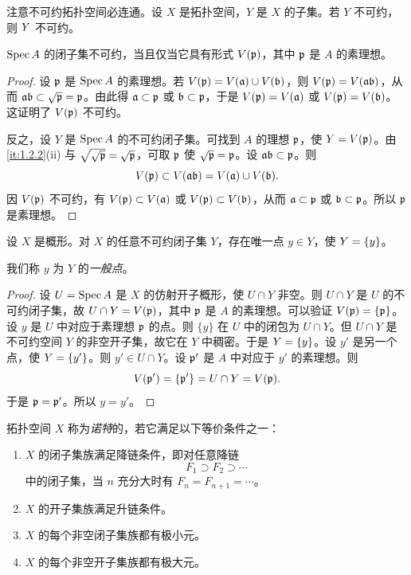 注意不可约拓扑空间必连通。设 $X$ 是拓扑空间，$Y$ 是 $X$ 的子集。若 $Y$ 不可约，则 $Y$ 不可约。

\begin{proposition}\label{it:1.3.2}
$\operatorname{Spec} A$ 的闭子集不可约，当且仅当它具有形式 $V(\mathfrak{p})$，其中 $\mathfrak{p}$ 是 $A$ 的素理想。
\end{proposition}

\begin{proof}
设 $\mathfrak{p}$ 是 $\operatorname{Spec} A$ 的素理想。若 $V(\mathfrak{p})=V(\mathfrak{a})\cup V(\mathfrak{b})$，则 $V(\mathfrak{p})=V(\mathfrak{a}\mathfrak{b})$，从而 $\mathfrak{a}\mathfrak{b}\subset \sqrt{\mathfrak{p}}=\mathfrak{p}$。由此得 $\mathfrak{a}\subset \mathfrak{p}$ 或 $\mathfrak{b}\subset \mathfrak{p}$，于是 $V(\mathfrak{p})=V(\mathfrak{a})$ 或 $V(\mathfrak{p})=V(\mathfrak{b})$。这证明了 $V(\mathfrak{p})$ 不可约。

反之，设 $Y$ 是 $\operatorname{Spec} A$ 的不可约闭子集。可找到 $A$ 的理想 $\mathfrak{p}$，使 $Y=V(\mathfrak{p})$。由 \ref{it:1.2.2}(ii) 与 $\sqrt{\sqrt{\mathfrak{p}}}=\sqrt{\mathfrak{p}}$，可取 $\mathfrak{p}$ 使 $\sqrt{\mathfrak{p}}=\mathfrak{p}$。设 $\mathfrak{a}\mathfrak{b}\subset \mathfrak{p}$。则
\[
V(\mathfrak{p})\subset V(\mathfrak{a}\mathfrak{b})=V(\mathfrak{a})\cup V(\mathfrak{b}).
\]
因 $V(\mathfrak{p})$ 不可约，有 $V(\mathfrak{p})\subset V(\mathfrak{a})$ 或 $V(\mathfrak{p})\subset V(\mathfrak{b})$，从而 $\mathfrak{a}\subset \mathfrak{p}$ 或 $\mathfrak{b}\subset \mathfrak{p}$。所以 $\mathfrak{p}$ 是素理想。
\end{proof}

\begin{proposition}\label{it:1.3.3}
设 $X$ 是概形。对 $X$ 的任意不可约闭子集 $Y$，存在唯一点 $y\in Y$，使 $Y=\{y\}$。
\end{proposition}

我们称 $y$ 为 $Y$ 的\emph{一般点}。

\begin{proof}
设 $U=\operatorname{Spec} A$ 是 $X$ 的仿射开子概形，使 $U\cap Y$ 非空。则 $U\cap Y$ 是 $U$ 的不可约闭子集，故 $U\cap Y=V(\mathfrak{p})$，其中 $\mathfrak{p}$ 是 $A$ 的素理想。可以验证 $V(\mathfrak{p})=\{\mathfrak{p}\}$。设 $y$ 是 $U$ 中对应于素理想 $\mathfrak{p}$ 的点。则 $\{y\}$ 在 $U$ 中的闭包为 $U\cap Y$。但 $U\cap Y$ 是不可约空间 $Y$ 的非空开子集，故它在 $Y$ 中稠密。于是 $Y=\{y\}$。设 $y'$ 是另一个点，使 $Y=\{y'\}$。则 $y'\in U\cap Y$。设 $\mathfrak{p}'$ 是 $A$ 中对应于 $y'$ 的素理想。则
\[
V(\mathfrak{p}')=\{\mathfrak{p}'\}=U\cap Y=V(\mathfrak{p}).
\]
于是 $\mathfrak{p}=\mathfrak{p}'$。所以 $y=y'$。
\end{proof}

拓扑空间 $X$ 称为\emph{诺特}的，若它满足以下等价条件之一：
\begin{enumerate}[label=(\roman*),leftmargin=2.8em]
  \item $X$ 的闭子集族满足降链条件，即对任意降链
  \[
  F_1\supset F_2\supset\cdots
  \]
  中的闭子集，当 $n$ 充分大时有 $F_n=F_{n+1}=\cdots$。
  \item $X$ 的开子集族满足升链条件。
  \item $X$ 的每个非空闭子集族都有极小元。
  \item $X$ 的每个非空开子集族都有极大元。
\end{enumerate}


